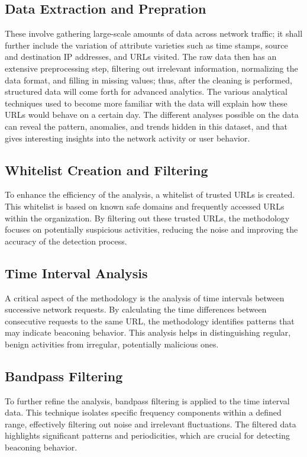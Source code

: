 \subsection{Data Extraction and Prepration}
These involve gathering large-scale amounts of data across network traffic; it shall further include the variation of attribute varieties such as time stamps, source and destination IP addresses, and URLs visited. The raw data then has an extensive preprocessing step, filtering out irrelevant information, normalizing the data format, and filling in missing values; thus, after the cleaning is performed, structured data will come forth for advanced analytics. The various analytical techniques used to become more familiar with the data will explain how these URLs would behave on a certain day. The different analyses possible on the data can reveal the pattern, anomalies, and trends hidden in this dataset, and that gives interesting insights into the network activity or user behavior. 

\subsection{Whitelist Creation and Filtering}
To enhance the efficiency of the analysis, a whitelist of trusted URLs is created. This whitelist is based on known safe domains and frequently accessed URLs within the organization. By filtering out these trusted URLs, the methodology focuses on potentially suspicious activities, reducing the noise and improving the accuracy of the detection process.

\subsection{Time Interval Analysis}
A critical aspect of the methodology is the analysis of time intervals between successive network requests. By calculating the time differences between consecutive requests to the same URL, the methodology identifies patterns that may indicate beaconing behavior. This analysis helps in distinguishing regular, benign activities from irregular, potentially malicious ones.

\subsection{Bandpass Filtering}
To further refine the analysis, bandpass filtering is applied to the time interval data. This technique isolates specific frequency components within a defined range, effectively filtering out noise and irrelevant fluctuations. The filtered data highlights significant patterns and periodicities, which are crucial for detecting beaconing behavior.

